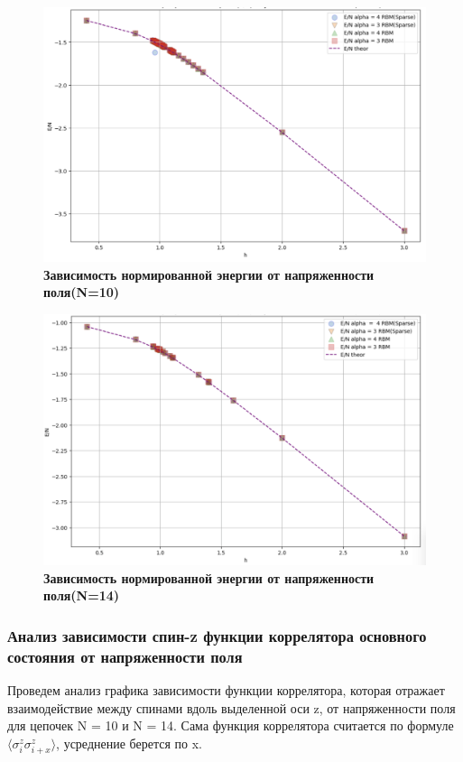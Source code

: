 \begin{figure}[H]
    \centering
    \includegraphics[width=0.8\linewidth]{Course_work/Images/E-N-10.png}
    \caption{\textbf{Зависимость нормированной энергии  от напряженности поля(N=10)}}
    \label{fig:e4}
\end{figure}

\begin{figure}[H]
    \centering
    \includegraphics[width=0.8\linewidth]{Course_work/Images/E-N-14.png}
    \caption{\textbf{Зависимость нормированной энергии  от напряженности поля(N=14)}}
    \label{fig:e5}
\end{figure}

\subsubsection{Анализ зависимости спин-z функции коррелятора основного состояния от напряженности поля}

Проведем анализ графика зависимости  функции коррелятора, которая отражает взаимодействие между спинами вдоль выделенной оси z, от напряженности поля для цепочек N = 10 и N = 14.
Сама функция коррелятора считается по формуле $\langle \sigma_i^z \sigma_{i+x}^z \rangle$, усреднение берется по x.

